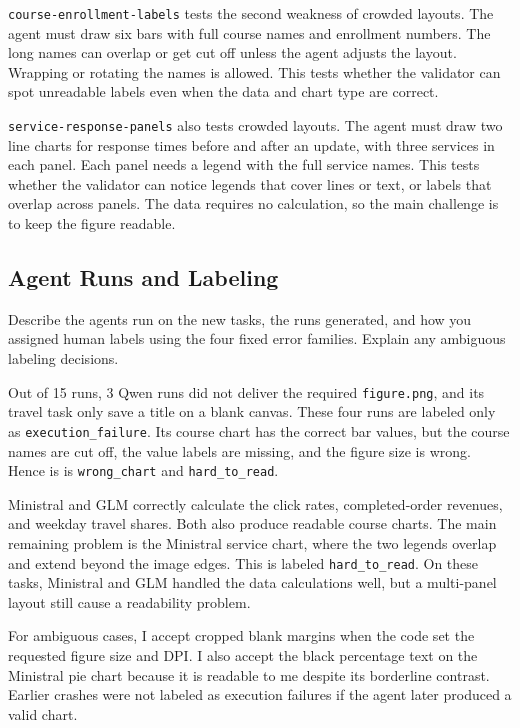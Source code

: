 \documentclass[11pt]{article}
\begin{document}
\texttt{course-enrollment-labels} tests the second weakness of crowded layouts.
The agent must draw six bars with full course names and enrollment numbers.
The long names can overlap or get cut off unless the agent adjusts the layout.
Wrapping or rotating the names is allowed. This tests whether the validator can
spot unreadable labels even when the data and chart type are correct.

\texttt{service-response-panels} also tests crowded layouts. The agent must
draw two line charts for response times before and after an update, with three
services in each panel. Each panel needs a legend with the full service names.
This tests whether the validator can notice legends that cover lines or text, or
labels that overlap across panels. The data requires no calculation, so the
main challenge is to keep the figure readable.

\subsection{Agent Runs and Labeling}
Describe the agents run on the new tasks, the runs generated, and how you
assigned human labels using the four fixed error families. Explain any
ambiguous labeling decisions.

\medskip
Out of 15 runs, 3 Qwen runs did not deliver the required \texttt{figure.png}, and 
its travel task only save a title on a blank canvas. These four runs are labeled only 
as \texttt{execution\_failure}. Its course chart has the correct bar values, but
the course names are cut off, the value labels are missing, and the figure
size is wrong. Hence is is \texttt{wrong\_chart} and \texttt{hard\_to\_read}.

Ministral and GLM correctly calculate the click rates, completed-order revenues,
and weekday travel shares. Both also produce readable course charts. The main
remaining problem is the Ministral service chart, where the two legends
overlap and extend beyond the image edges. This is labeled
\texttt{hard\_to\_read}. On these tasks, Ministral and GLM handled the data
calculations well, but a multi-panel layout still cause a readability problem.

For ambiguous cases, I accept cropped blank margins when the code set the
requested figure size and DPI. I also accept the black percentage text on
the Ministral pie chart because it is readable to me despite its borderline contrast.
Earlier crashes were not labeled as execution failures if the agent later
produced a valid chart.
\end{document}
